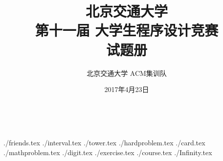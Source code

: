\documentclass[12pt,a4paper,oneside,titlepage]{article}
\title{北京交通大学 \\ 第十一届 大学生程序设计竞赛 \\ 试题册}
\date{2017年4月23日}
\author{北京交通大学 ACM集训队}
\newcommand{\importproblem}[1]{{./#1.tex}}
\begin{document}
\maketitle

\thispagestyle{empty}
　
\clearpage

\setcounter{page}{1}

\raggedbottom

\def\NoInputFileName{}
\def\NoOutputFileName{}

\displayauthorinfootertrue
\intentionallyblankpagestrue

\importproblem{friends}
\importproblem{interval}
\importproblem{tower}
\importproblem{hardproblem}
\importproblem{card}
\importproblem{mathproblem}
\importproblem{digit}
\importproblem{exercise}
\importproblem{course}
\importproblem{Infinity}
\end{document}
